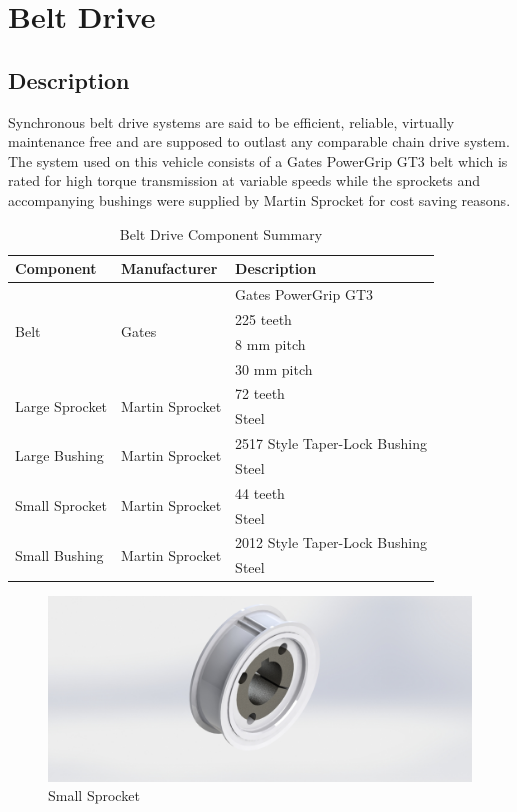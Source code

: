 \section{Belt Drive}\label{sec:belt_drive}
\subsection{Description}
Synchronous belt drive systems are said to be efficient, reliable, virtually maintenance free and are supposed to outlast any comparable chain drive system. The system used on this vehicle consists of a Gates PowerGrip GT3 belt which is rated for high torque transmission at variable speeds while the sprockets and accompanying bushings were supplied by Martin Sprocket for cost saving reasons.

\begin{table}[htbp]
	\centering
	\caption{Belt Drive Component Summary}
	\begin{tabular}{| lll |} \hline
		Component & Manufacturer & Description \\ \hline
		\multirow{4}{*}{Belt} & \multirow{4}{*}{Gates} & Gates PowerGrip GT3 \\
		& & 225 teeth \\
		& & 8 mm pitch \\
		& & 30 mm pitch \\ \hline
		\multirow{2}{*}{Large Sprocket} & \multirow{2}{*}{Martin Sprocket} & 72 teeth\\
		& & Steel \\ \hline
		\multirow{2}{*}{Large Bushing} & \multirow{2}{*}{Martin Sprocket} & 2517 Style Taper-Lock Bushing\\
		& & Steel \\ \hline
		\multirow{2}{*}{Small Sprocket} & \multirow{2}{*}{Martin Sprocket} & 44 teeth\\
		& & Steel \\ \hline
		\multirow{2}{*}{Small Bushing} & \multirow{2}{*}{Martin Sprocket} & 2012 Style Taper-Lock Bushing\\
		& & Steel \\ \hline
	\end{tabular}
	\label{tab:drive_comp}
\end{table}

\begin{figure}[h]\centering
	\includegraphics[width=.7\linewidth]{dom/small_sprocket_with_bushing_rndr.jpg}
	\caption{Small Sprocket}
	\label{fig:small_sprocket}
\end{figure}

